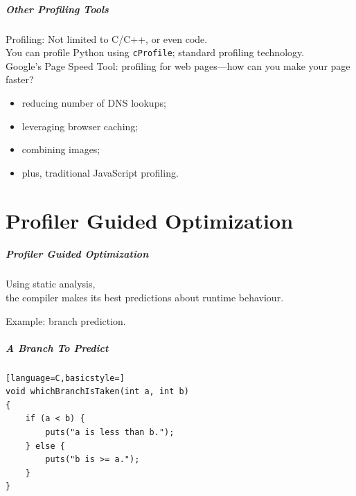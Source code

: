 \begin{frame}[fragile]
  \frametitle{Other Profiling Tools}

  

\begin{changemargin}{1.5cm}
    Profiling: Not limited to C/C++, or even code.\\[1em]

    You can profile Python using {\tt cProfile}; standard profiling technology.\\[1em]

    Google's Page Speed Tool: profiling for web pages---how can you make your page faster?\\
\begin{itemize}
\item reducing number of DNS lookups;
\item leveraging browser caching;
\item combining images;
\item plus, traditional JavaScript profiling.
\end{itemize}
\end{changemargin}
\end{frame}

\part{Profiler Guided Optimization}
\begin{frame}
\partpage
\end{frame}

\begin{frame}
\frametitle{Profiler Guided Optimization}


\begin{changemargin}{2cm}

Using static analysis, \\
the compiler makes its best predictions about runtime behaviour.

Example: branch prediction. 
\end{changemargin}

\end{frame}



\begin{frame}[fragile]
\frametitle{A Branch To Predict}
\begin{changemargin}{1.5cm}
\begin{lstlisting}[language=C,basicstyle=]
void whichBranchIsTaken(int a, int b)
{
    if (a < b) {
        puts("a is less than b.");
    } else {
        puts("b is >= a.");
    }
}
\end{lstlisting}
\end{changemargin}
\end{frame}


